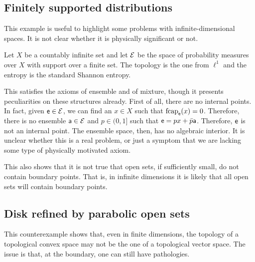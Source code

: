 \subsection{Finitely supported distributions}

This example is useful to highlight some problems with infinite-dimensional spaces. It is not clear whether it is physically significant or not.

\begin{example}
	Let $X$ be a countably infinite set and let $\Ens$ be the space of probability measures over $X$ with support over a finite set. The topology is the one from $\ell^1$ and the entropy is the standard Shannon entropy.
\end{example}

This satisfies the axioms of ensemble and of mixture, though it presents peculiarities on these structures already. First of all, there are no internal points. In fact, given $\ens \in \Ens$, we can find an $x \in X$ such that $\fcap_{\ens}(x) = 0$. Therefore, there is no ensemble $\ens[a] \in \Ens$ and $p \in (0,1]$ such that $\ens = p x + \bar{p} \ens[a]$. Therefore, $\ens$ is not an internal point. The ensemble space, then, has no algebraic interior. It is unclear whether this is a real problem, or just a symptom that we are lacking some type of physically motivated axiom.

This also shows that it is not true that open sets, if sufficiently small, do not contain boundary points. That is, in infinite dimensions it is likely that all open sets will contain boundary points.

\subsection{Disk refined by parabolic open sets}

This counterexample shows that, even in finite dimensions, the topology of a topological convex space may not be the one of a topological vector space. The issue is that, at the boundary, one can still have pathologies.

